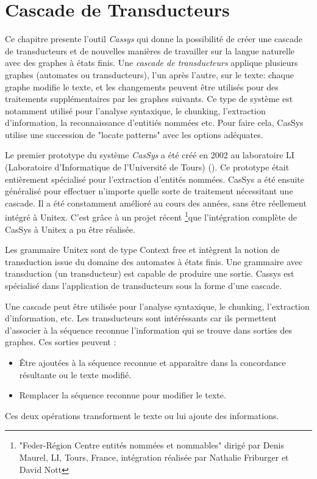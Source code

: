 \chapter{Cascade de Transducteurs}
\label{chap-cassys}

Ce chapitre presente l'outil \textit{Cassys} qui donne la possibilité de créer une cascade
de  transducteurs et de nouvelles manières de travailler sur la langue naturelle avec des 
graphes à états finis. Une \textit{cascade de transducteurs} 
applique plusieurs graphes (automates ou transducteurs), l'un après l'autre, sur le texte: chaque
graphe modifie le texte, et les changements peuvent être utilisés pour des traitements supplémentaires
par les graphes suivants. Ce type de  système est notamment utilisé pour l'analyse syntaxique, le chunking,
l'extraction d'information, la reconnaissance d'entitiés nommées etc. Pour faire cela, CasSys utilise
une succession de "locate patterns" avec les options adéquates.

\bigskip
\noindent Le premier prototype du système \textit{CasSys}   a été créé en 2002 au 
laboratoire LI (Laboratoire d'Informatique de l'Université de Tours) (\cite{these-nathalie}). 
Ce prototype était entièrement spécialisé pour l'extraction d'entités nommées. CasSys a été  
ensuite généralisé pour effectuer n'importe quelle sorte de traitement nécessitant une cascade. 
Il a été constamment amélioré au cours des années, sans être réellement intégré à Unitex. 
C'est grâce à un projet récent \footnote{"Feder-Région Centre entités nommées et nommables" 
dirigé par Denis Maurel, LI, Tours, France, intégration réalisée par Nathalie Friburger et
David Nott}que l'intégration complète  de CasSys à Unitex a pu être réalisée.

Les grammaire Unitex sont de type Context free et intègrent la notion de transduction issue
du domaine des automates à états finis. Une grammaire avec transduction (un  transducteur) est
capable de produire une sortie. Cassys est spécialisé dans l'application de transducteurs sous
la forme d'une cascade.

\bigskip
Une cascade peut être utilisée pour l'analyse syntaxique, le chunking, l'extraction d'information, etc. 
\noindent Les transducteurs sont intéréssants car ils permettent d'associer à la séquence
reconnue l'information qui se trouve dans sorties des graphes.
Ces  sorties peuvent :
\begin{itemize}
\item Être ajoutées à la séquence reconnue et apparaître dans la concordance résultante ou le texte modifié.
\item Remplacer la séquence reconnue pour modifier le texte.
\end{itemize}
\noindent Ces deux  opérations transforment le texte ou lui ajoute des informations.


